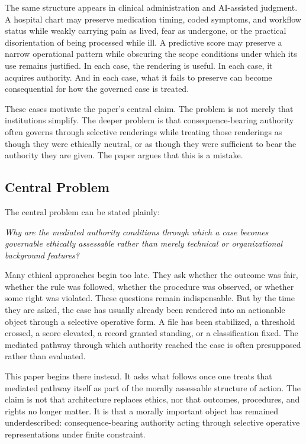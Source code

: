 \documentclass[11pt]{article}
\renewenvironment{quote}
  {\list{}{\leftmargin=1.4em \rightmargin=1.0em}%
   \item\relax\color{softink}\itshape}
  {\endlist}
\begin{document}
The same structure appears in clinical administration and AI-assisted judgment. A hospital chart may preserve medication timing, coded symptoms, and workflow status while weakly carrying pain as lived, fear as undergone, or the practical disorientation of being processed while ill. A predictive score may preserve a narrow operational pattern while obscuring the scope conditions under which its use remains justified. In each case, the rendering is useful. In each case, it acquires authority. And in each case, what it fails to preserve can become consequential for how the governed case is treated. \cite{LepriEtAl2018FairTransparentAccountableADM,Tabassi2023NISTAIRMF,Douglas2004IrreducibleComplexityObjectivity,Fricker2007EpistemicInjustice}

These cases motivate the paper's central claim. The problem is not merely that institutions simplify. The deeper problem is that consequence-bearing authority often governs through selective renderings while treating those renderings as though they were ethically neutral, or as though they were sufficient to bear the authority they are given. The paper argues that this is a mistake.

\subsection{Central Problem}

The central problem can be stated plainly:

\begin{quote}
Why are the mediated authority conditions through which a case becomes governable ethically assessable rather than merely technical or organizational background features?
\end{quote}

Many ethical approaches begin too late. They ask whether the outcome was fair, whether the rule was followed, whether the procedure was observed, or whether some right was violated. These questions remain indispensable. But by the time they are asked, the case has usually already been rendered into an actionable object through a selective operative form. A file has been stabilized, a threshold crossed, a score elevated, a record granted standing, or a classification fixed. The mediated pathway through which authority reached the case is often presupposed rather than evaluated.

This paper begins there instead. It asks what follows once one treats that mediated pathway itself as part of the morally assessable structure of action. The claim is not that architecture replaces ethics, nor that outcomes, procedures, and rights no longer matter. It is that a morally important object has remained underdescribed: consequence-bearing authority acting through selective operative representations under finite constraint.
\end{document}
